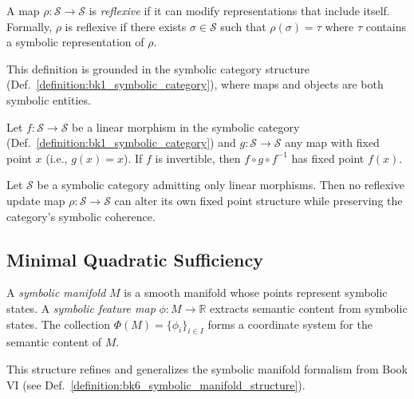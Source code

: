 \begin{definition}
\label{definition:bk1_reflexive_update_map}
A map $\rho: \mathcal{S} \to \mathcal{S}$ is \emph{reflexive} if it can modify representations that include itself. Formally, $\rho$ is reflexive if there exists $\sigma \in \mathcal{S}$ such that $\rho(\sigma) = \tau$ where $\tau$ contains a symbolic representation of $\rho$.

This definition is grounded in the symbolic category structure (Def.~\ref{definition:bk1_symbolic_category}), where maps and objects are both symbolic entities.
\end{definition}

\begin{lemma}
\label{lemma:bk1_fixed_point_inheritance}
Let $f: \mathcal{S} \to \mathcal{S}$ be a linear morphism in the symbolic category (Def.~\ref{definition:bk1_symbolic_category}) and $g: \mathcal{S} \to \mathcal{S}$ any map with fixed point $x$ (i.e., $g(x) = x$). If $f$ is invertible, then $f \circ g \circ f^{-1}$ has fixed point $f(x)$.
\end{lemma}

\begin{proposition}
\label{proposition:bk1_limitation_linear_reflexive_maps}
Let $\mathcal{S}$ be a symbolic category admitting only linear morphisms. Then no reflexive update map $\rho: \mathcal{S} \to \mathcal{S}$ can alter its own fixed point structure while preserving the category's symbolic coherence.
\end{proposition}

\subsection{Minimal Quadratic Sufficiency}
\label{subsec:bk1_minimal_quadratic_sufficiency}

\begin{definition}
\label{definition:bk1_symbolic_manifold_feature_maps}
A \emph{symbolic manifold} $M$ is a smooth manifold whose points represent symbolic states. A \emph{symbolic feature map} $\phi: M \to \mathbb{R}$ extracts semantic content from symbolic states. The collection $\Phi(M) = \{\phi_i\}_{i \in I}$ forms a coordinate system for the semantic content of $M$.

This structure refines and generalizes the symbolic manifold formalism from Book VI (see Def.~\ref{definition:bk6_symbolic_manifold_structure}).
\end{definition}

